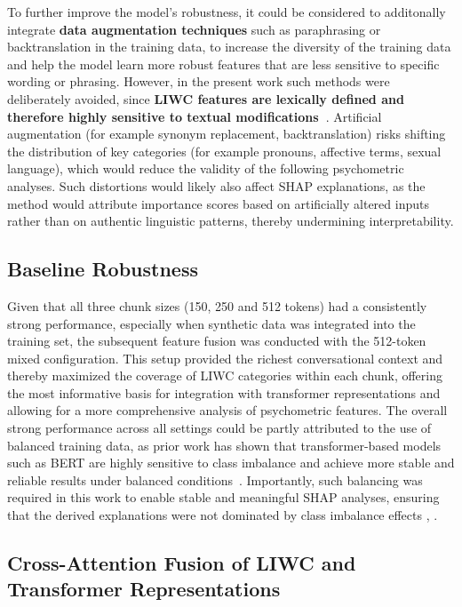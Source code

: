 To further improve the model's robustness, it could be considered to additonally integrate \textbf{data augmentation techniques} such as paraphrasing or backtranslation in the training data, to increase the diversity of the training data and help the model learn more robust features that are less sensitive to specific wording or phrasing. However, in the present work such methods were deliberately avoided, since \textbf{LIWC features are lexically defined and therefore highly sensitive to textual modifications~\cite{tausczik2010psychological}}. Artificial augmentation (for example synonym replacement, backtranslation) risks shifting the distribution of key categories (for example pronouns, affective terms, sexual language), which would reduce the validity of the following psychometric analyses. Such distortions would likely also affect SHAP explanations, as the method would attribute importance scores based on artificially altered inputs rather than on authentic linguistic patterns, thereby undermining interpretability. 

\subsection{Baseline Robustness}
Given that all three chunk sizes (150, 250 and 512 tokens) had a consistently strong performance, especially when synthetic data was integrated into the training set, the subsequent feature fusion was conducted with the 512-token mixed configuration. This setup provided the richest conversational context and thereby maximized the coverage of LIWC categories within each chunk, offering the most informative basis for integration with transformer representations and allowing for a more comprehensive analysis of psychometric features. The overall strong performance across all settings could be partly attributed to the use of balanced training data, as prior work has shown that transformer-based models such as BERT are highly sensitive to class imbalance and achieve more stable and reliable results under balanced conditions~\cite{henningnlpclassimbalance2023}. Importantly, such balancing was required in this work to enable stable and meaningful SHAP analyses, ensuring that the derived explanations were not dominated by class imbalance effects \parencite{liu2022balancedbackgroundexplanationdata}, \parencite{chen2024interpretable}. 


\subsection{Cross-Attention Fusion of LIWC and Transformer Representations}

